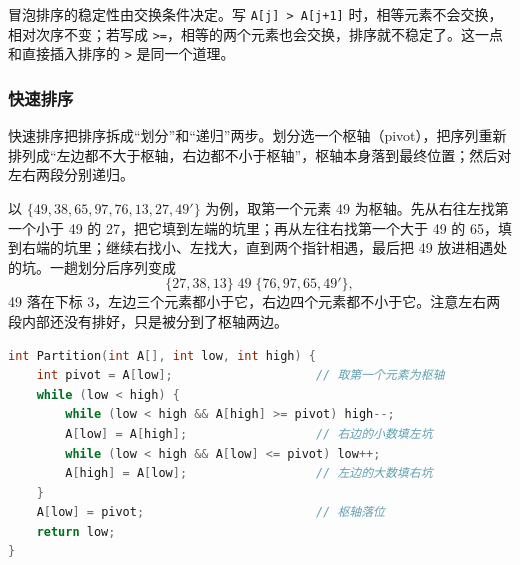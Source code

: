 冒泡排序的稳定性由交换条件决定。写 \texttt{A[j] > A[j+1]} 时，相等元素不会交换，相对次序不变；若写成 \texttt{>=}，相等的两个元素也会交换，排序就不稳定了。这一点和直接插入排序的 \texttt{>} 是同一个道理。

\subsubsection{快速排序}

快速排序把排序拆成“划分”和“递归”两步。划分选一个枢轴（pivot），把序列重新排列成“左边都不大于枢轴，右边都不小于枢轴”，枢轴本身落到最终位置；然后对左右两段分别递归。

以 $\{49,38,65,97,76,13,27,49'\}$ 为例，取第一个元素 49 为枢轴。先从右往左找第一个小于 49 的 27，把它填到左端的坑里；再从左往右找第一个大于 49 的 65，填到右端的坑里；继续右找小、左找大，直到两个指针相遇，最后把 49 放进相遇处的坑。一趟划分后序列变成
\[
\{27,38,13\}\;49\;\{76,97,65,49'\},
\]
49 落在下标 3，左边三个元素都小于它，右边四个元素都不小于它。注意左右两段内部还没有排好，只是被分到了枢轴两边。

\begin{lstlisting}[language=C]
int Partition(int A[], int low, int high) {
    int pivot = A[low];                    // 取第一个元素为枢轴
    while (low < high) {
        while (low < high && A[high] >= pivot) high--;
        A[low] = A[high];                  // 右边的小数填左坑
        while (low < high && A[low] <= pivot) low++;
        A[high] = A[low];                  // 左边的大数填右坑
    }
    A[low] = pivot;                        // 枢轴落位
    return low;
}
\end{lstlisting}

